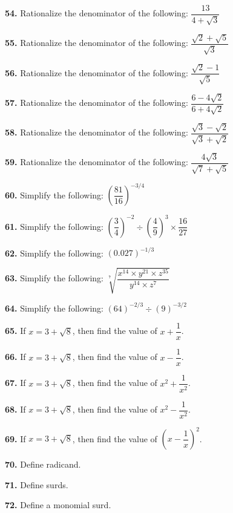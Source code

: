 \documentclass[11pt]{article}
\begin{document}
\bigskip
\noindent\textbf{54.} Rationalize the denominator of the following: $\dfrac{13}{4+\sqrt{3}}$

\bigskip
\noindent\textbf{55.} Rationalize the denominator of the following: $\dfrac{\sqrt{2}+\sqrt{5}}{\sqrt{3}}$

\bigskip
\noindent\textbf{56.} Rationalize the denominator of the following: $\dfrac{\sqrt{2}-1}{\sqrt{5}}$

\bigskip
\noindent\textbf{57.} Rationalize the denominator of the following: $\dfrac{6-4\sqrt{2}}{6+4\sqrt{2}}$

\bigskip
\noindent\textbf{58.} Rationalize the denominator of the following: $\dfrac{\sqrt{3}-\sqrt{2}}{\sqrt{3}+\sqrt{2}}$

\bigskip
\noindent\textbf{59.} Rationalize the denominator of the following: $\dfrac{4\sqrt{3}}{\sqrt{7}+\sqrt{5}}$

\bigskip
\noindent\textbf{60.} Simplify the following: $\left(\dfrac{81}{16}\right)^{-3/4}$

\bigskip
\noindent\textbf{61.} Simplify the following: $\left(\dfrac{3}{4}\right)^{-2} \div \left(\dfrac{4}{9}\right)^{3} \times \dfrac{16}{27}$

\bigskip
\noindent\textbf{62.} Simplify the following: $(0.027)^{-1/3}$

\bigskip
\noindent\textbf{63.} Simplify the following: $\sqrt[7]{\dfrac{x^{14}\times y^{21}\times z^{35}}{y^{14}\times z^{7}}}$

\bigskip
\noindent\textbf{64.} Simplify the following: $(64)^{-2/3} \div (9)^{-3/2}$

\bigskip
\noindent\textbf{65.} If $x=3+\sqrt{8}$, then find the value of $x+\dfrac{1}{x}$.

\bigskip
\noindent\textbf{66.} If $x=3+\sqrt{8}$, then find the value of $x-\dfrac{1}{x}$.

\bigskip
\noindent\textbf{67.} If $x=3+\sqrt{8}$, then find the value of $x^2+\dfrac{1}{x^2}$.

\bigskip
\noindent\textbf{68.} If $x=3+\sqrt{8}$, then find the value of $x^2-\dfrac{1}{x^2}$.

\bigskip
\noindent\textbf{69.} If $x=3+\sqrt{8}$, then find the value of $\left(x-\dfrac{1}{x}\right)^2$.

\bigskip
\noindent\textbf{70.} Define radicand.

\bigskip
\noindent\textbf{71.} Define surds.

\bigskip
\noindent\textbf{72.} Define a monomial surd.
\end{document}

